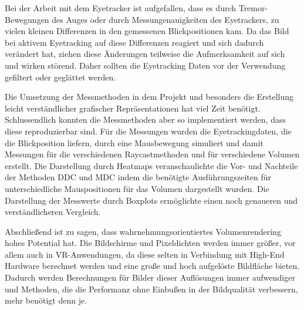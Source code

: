 Bei der Arbeit mit dem Eyetracker ist aufgefallen, dass es durch Tremor-Bewegungen des Auges oder durch Messungenauigkeiten des Eyetrackers, zu vielen kleinen Differenzen in den gemessenen Blickpositionen kam. 
Da das Bild bei aktivem Eyetracking auf diese Differenzen reagiert und sich dadurch verändert hat, ziehen diese Änderungen teilweise die Aufmerksamkeit auf sich und wirken störend.
Daher sollten die Eyetracking Daten vor der Verwendung gefiltert oder geglättet werden.

Die Umsetzung der Messmethoden in dem Projekt und besonders die Erstellung leicht verständlicher grafischer Repräsentationen hat viel Zeit benötigt.
Schlussendlich konnten die Messmethoden aber so implementiert werden, dass diese reproduzierbar sind.
Für die Messungen wurden die Eyetrackingdaten, die die Blickposition liefern, durch eine Mausbewegung simuliert und damit Messungen für die verschiedenen Raycastmethoden und für verschiedene Volumen erstellt.
Die Darstellung durch Heatmaps veranschaulichte die Vor- und Nachteile der Methoden DDC und MDC indem die benötigte Ausführungszeiten für unterschiedliche Mauspositionen für das Volumen dargestellt wurden.
Die Darstellung der Messwerte durch Boxplots ermöglichte einen noch genaueren und verständlicheren Vergleich.

Abschließend ist zu sagen, dass wahrnehmungsorientiertes Volumenrendering hohes Potential hat.
Die Bildschirme und Pixeldichten werden immer größer, vor allem auch in VR-Anwendungen, da diese selten in Verbindung mit High-End Hardware berechnet werden und eine große und hoch aufgelöste Bildfläche bieten.
Dadurch werden Berechnungen für Bilder dieser Auflösungen immer aufwendiger und Methoden, die die Performanz ohne Einbußen in der Bildqualität verbessern, mehr benötigt denn je.